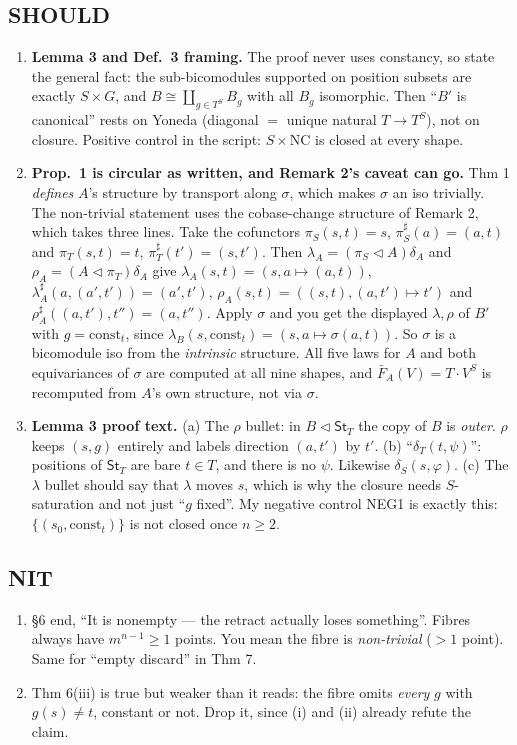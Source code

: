 \documentclass[10pt]{article}
\newcommand{\tri}{\mathbin{\triangleleft}}
\newcommand{\St}{\mathsf{St}}
\newcommand{\cst}{\mathrm{const}}
\begin{document}
\subsection*{SHOULD}
\begin{enumerate}[label=\textbf{S\arabic*.},leftmargin=*]
\item \textbf{Lemma 3 and Def.~3 framing.} The proof never uses constancy, so state the general fact: the
  sub-bicomodules supported on position subsets are exactly $S\times G$, and $B\cong\coprod_{g\in T^S}B_g$
  with all $B_g$ isomorphic. Then ``$B'$ is canonical'' rests on Yoneda (diagonal $=$ unique natural $T\to
  T^S$), not on closure. Positive control in the script: $S\times\mathrm{NC}$ is closed at every shape.
\item \textbf{Prop.~1 is circular as written, and Remark 2's caveat can go.} Thm 1 \emph{defines} $A$'s
  structure by transport along $\sigma$, which makes $\sigma$ an iso trivially. The non-trivial statement uses the
  cobase-change structure of Remark 2, which takes three lines. Take the cofunctors
  $\pi_S(s,t)=s$, $\pi_S^\sharp(a)=(a,t)$ and $\pi_T(s,t)=t$, $\pi_T^\sharp(t')=(s,t')$. Then
  $\lambda_A=(\pi_S\tri A)\delta_A$ and $\rho_A=(A\tri\pi_T)\delta_A$ give
  $\lambda_A(s,t)=(s,a\mapsto(a,t))$, $\lambda_A^\sharp(a,(a',t'))=(a',t')$,
  $\rho_A(s,t)=((s,t),(a,t')\mapsto t')$ and $\rho_A^\sharp((a,t'),t'')=(a,t'')$.
  Apply $\sigma$ and you get the displayed $\lambda,\rho$ of $B'$ with $g=\cst_t$, since
  $\lambda_B(s,\cst_t)=(s,a\mapsto\sigma(a,t))$. So $\sigma$ is a bicomodule iso from the
  \emph{intrinsic} structure. All five laws for $A$ and both equivariances of $\sigma$ are computed at all nine shapes,
  and $\bar F_A(V)=T\cdot V^S$ is recomputed from $A$'s own structure, not via $\sigma$.
\item \textbf{Lemma 3 proof text.} (a) The $\rho$ bullet: in $B\tri\St_T$ the copy of $B$ is \emph{outer}. $\rho$
  keeps $(s,g)$ entirely and labels direction $(a,t')$ by $t'$. (b) ``$\delta_T(t,\psi)$'': positions of $\St_T$
  are bare $t\in T$, and there is no $\psi$. Likewise $\delta_S(s,\varphi)$. (c) The $\lambda$ bullet should say that
  $\lambda$ moves $s$, which is why the closure needs $S$-saturation and not just ``$g$ fixed''. My negative control NEG1
  is exactly this: $\{(s_0,\cst_t)\}$ is not closed once $n\ge2$.
\end{enumerate}

\subsection*{NIT}
\begin{enumerate}[label=\textbf{N\arabic*.},leftmargin=*]
\item \S6 end, ``It is nonempty --- the retract actually loses something''. Fibres always have $m^{n-1}\ge1$ points.
  You mean the fibre is \emph{non-trivial} ($>1$ point). Same for ``empty discard'' in Thm 7.
\item Thm 6(iii) is true but weaker than it reads: the fibre omits \emph{every} $g$ with $g(s)\ne t$,
  constant or not. Drop it, since (i) and (ii) already refute the claim.
\end{enumerate}
\end{document}
